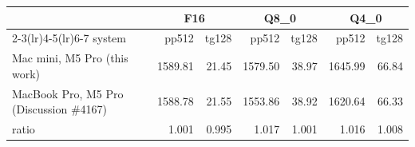 \begin{tabular}{l rr rr rr}
\toprule
 & \multicolumn{2}{c}{F16} & \multicolumn{2}{c}{Q8\_0} & \multicolumn{2}{c}{Q4\_0} \\
\cmidrule(lr){2-3}\cmidrule(lr){4-5}\cmidrule(lr){6-7}
system & pp512 & tg128 & pp512 & tg128 & pp512 & tg128 \\
\midrule
Mac mini, M5 Pro (this work) & 1589.81 & 21.45 & 1579.50 & 38.97 & 1645.99 & 66.84 \\
MacBook Pro, M5 Pro (Discussion \#4167) & 1588.78 & 21.55 & 1553.86 & 38.92 & 1620.64 & 66.33 \\
ratio & 1.001 & 0.995 & 1.017 & 1.001 & 1.016 & 1.008 \\
\bottomrule
\end{tabular}
